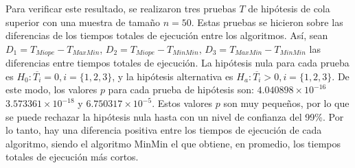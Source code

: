 Para verificar este resultado, se realizaron tres pruebas $T$ de hipótesis de cola superior con una muestra de tamaño $n=50$. Estas pruebas se hicieron sobre las diferencias de los tiempos totales de ejecución entre los algoritmos. Así, sean $D_1 = T_{Miope} - T_{MaxMin}$, $D_2 = T_{Miope} - T_{MinMin}$, $D_3 = T_{MaxMin} - T_{MinMin}$ las diferencias entre tiempos totales de ejecución. La hipótesis nula para cada prueba es $H_0: \overline{T_i} = 0, i=\{1,2,3\}$, y la hipótesis alternativa es $H_a: \overline{T_i} > 0, i=\{1,2,3\}$. De este modo, los valores $p$ para cada prueba de hipótesis son: $4.040898 \times 10^{-16}$ $3.573361 \times 10^{-18}$ y $6.750317 \times 10^{-5}$. Estos valores $p$ son muy pequeños, por lo que se puede rechazar la hipótesis nula hasta con un nivel de confianza del 99\%. Por lo tanto, hay una diferencia positiva entre los tiempos de ejecución de cada algoritmo, siendo el algoritmo MinMin el que obtiene, en promedio, los tiempos totales de ejecución más cortos.

